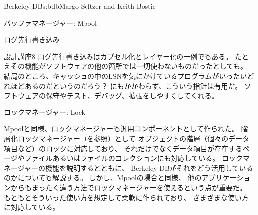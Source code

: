 \begin{aosachapter}{Berkeley DB}{s:bdb}{Margo Seltzer and Keith Bostic}
\begin{aosasect1}{バッファマネージャー: Mpool}
\begin{aosasect2}{ログ先行書き込み}
\begin{aosabox}{設計講座8}
ログ先行書き込みはカプセル化とレイヤー化の一例でもある。
たとえその機能がソフトウェアの他の箇所では一切使わないものだったとしても。
結局のところ、キャッシュの中のLSNを気にかけているプログラムがいったいどれほどあるのだというのだろう？
にもかかわらず、こういう指針は有用だ。
ソフトウェアの保守やテスト、デバッグ、拡張をしやすくしてくれる。

\end{aosabox}

\end{aosasect2}

\end{aosasect1}

\begin{aosasect1}{ロックマネージャー: Lock}


Mpoolと同様、ロックマネージャーも汎用コンポーネントとして作られた。
階層化ロックマネージャー（\cite{bib:gray:lock}を参照）として
オブジェクトの階層（個々のデータ項目など）のロックに対応しており、
それだけでなくデータ項目が存在するページやファイルあるいはファイルのコレクションにも対応している。
ロックマネージャーの機能を説明するとともに、
Berkeley DBがそれをどう活用しているのかについても解説する。
しかし、Mpoolの場合と同様、
他のアプリケーションからもまったく違う方法でロックマネージャーを使えるという点が重要だ。
もともとそういった使い方を想定して柔軟に作られており、
さまざまな使い方に対応している。


\end{aosasect1}
\end{aosachapter}
